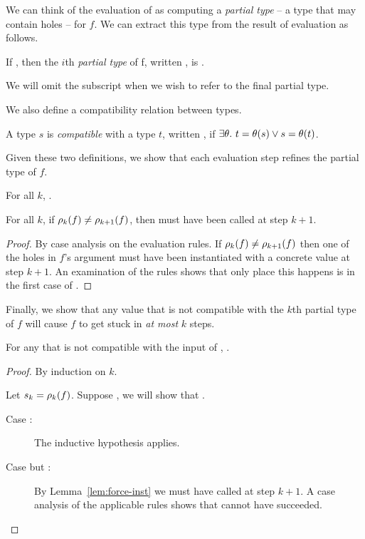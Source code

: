 We can think of the evaluation of  as
computing a \emph{partial type} -- a type that may contain holes -- for
$f$. We can extract this type from the result of evaluation as follows.
%
\begin{defn}
\label{defn:partial-type}
  If , then the $i$th
  \emph{partial type} of f, written ,
  is .

  We will omit the subscript when we wish to refer to the final partial
  type. 
\end{defn}
%
We also define a compatibility relation between types.
%
\begin{defn}
\label{defn:type-compat}
  A type $s$ is \emph{compatible} with a type $t$, written , if
  $\exists \theta.\ t = \theta(s) \lor s = \theta(t)$.
\end{defn}
%
Given these two definitions, we show that each evaluation step
refines the partial type of $f$.
%
\begin{lem}
\label{lem:refine-partial}
  For all $k$, .
\end{lem}
%
\begin{lem}
\label{lem:force-inst}
  For all $k$, if $\rho_{k}(f) \neq \rho_{k+1}(f)$, then \forcesym must
  have been called at step $k+1$.
\end{lem}
\begin{proof}
  By case analysis on the evaluation rules. 
  If $\rho_{k}(f) \neq \rho_{k+1}(f)$ then one of the holes in $f$'s
  argument must have been instantiated with a concrete value at step
  $k+1$.
  An examination of the rules shows that only place this happens is 
  in the first case of \forcesym.
\end{proof}
%
Finally, we show that any value that is not compatible with the $k$th
partial type of $f$ will cause $f$ to get stuck in \emph{at most} $k$
steps.
%
\begin{lem}
\label{lem:k-stuck}
  For any  that is not compatible with
  the input of , .
\end{lem}
\begin{proof}
  By induction on $k$.
  
  Let $s_k = \rho_{k}(f)$. Suppose , we
  will show that .
  \begin{description}
  \item[Case :] 
    The inductive hypothesis applies.
  \item[Case  but :] 
    By Lemma~\ref{lem:force-inst} we must have called \forcesym at step
    $k+1$. A case analysis of the applicable rules shows that \forcesym
    cannot have succeeded.
  \end{description}
\end{proof}
